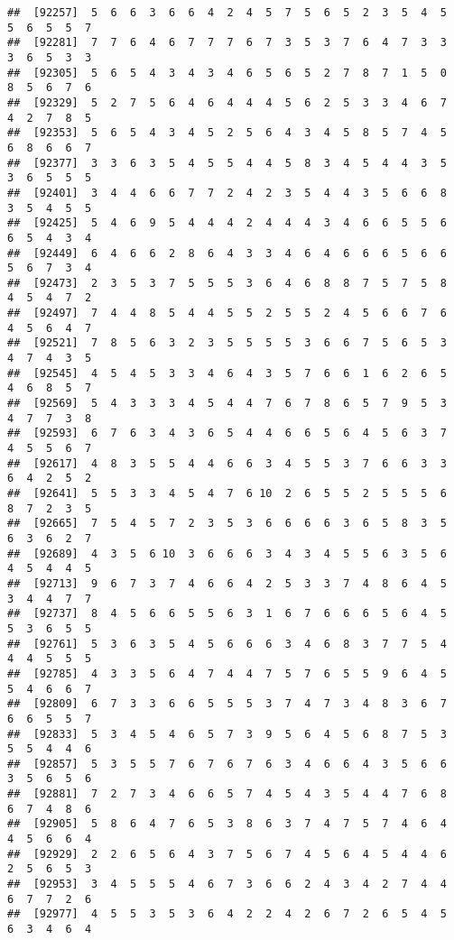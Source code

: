 \documentclass[
]{book}
\begin{document}
\begin{verbatim}
##  [92257]  5  6  6  3  6  6  4  2  4  5  7  5  6  5  2  3  5  4  5  5  6  5  5  7
##  [92281]  7  7  6  4  6  7  7  7  6  7  3  5  3  7  6  4  7  3  3  3  6  5  3  3
##  [92305]  5  6  5  4  3  4  3  4  6  5  6  5  2  7  8  7  1  5  0  8  5  6  7  6
##  [92329]  5  2  7  5  6  4  6  4  4  4  5  6  2  5  3  3  4  6  7  4  2  7  8  5
##  [92353]  5  6  5  4  3  4  5  2  5  6  4  3  4  5  8  5  7  4  5  6  8  6  6  7
##  [92377]  3  3  6  3  5  4  5  5  4  4  5  8  3  4  5  4  4  3  5  3  6  5  5  5
##  [92401]  3  4  4  6  6  7  7  2  4  2  3  5  4  4  3  5  6  6  8  3  5  4  5  5
##  [92425]  5  4  6  9  5  4  4  4  2  4  4  4  3  4  6  6  5  5  6  6  5  4  3  4
##  [92449]  6  4  6  6  2  8  6  4  3  3  4  6  4  6  6  6  5  6  6  5  6  7  3  4
##  [92473]  2  3  5  3  7  5  5  5  3  6  4  6  8  8  7  5  7  5  8  4  5  4  7  2
##  [92497]  7  4  4  8  5  4  4  5  5  2  5  5  2  4  5  6  6  7  6  4  5  6  4  7
##  [92521]  7  8  5  6  3  2  3  5  5  5  5  3  6  6  7  5  6  5  3  4  7  4  3  5
##  [92545]  4  5  4  5  3  3  4  6  4  3  5  7  6  6  1  6  2  6  5  4  6  8  5  7
##  [92569]  5  4  3  3  3  4  5  4  4  7  6  7  8  6  5  7  9  5  3  4  7  7  3  8
##  [92593]  6  7  6  3  4  3  6  5  4  4  6  6  5  6  4  5  6  3  7  4  5  5  6  7
##  [92617]  4  8  3  5  5  4  4  6  6  3  4  5  5  3  7  6  6  3  3  6  4  2  5  2
##  [92641]  5  5  3  3  4  5  4  7  6 10  2  6  5  5  2  5  5  5  6  8  7  2  3  5
##  [92665]  7  5  4  5  7  2  3  5  3  6  6  6  6  3  6  5  8  3  5  6  3  6  2  7
##  [92689]  4  3  5  6 10  3  6  6  6  3  4  3  4  5  5  6  3  5  6  4  5  4  4  5
##  [92713]  9  6  7  3  7  4  6  6  4  2  5  3  3  7  4  8  6  4  5  3  4  4  7  7
##  [92737]  8  4  5  6  6  5  5  6  3  1  6  7  6  6  6  5  6  4  5  5  3  6  5  5
##  [92761]  5  3  6  3  5  4  5  6  6  6  3  4  6  8  3  7  7  5  4  4  4  5  5  5
##  [92785]  4  3  3  5  6  4  7  4  4  7  5  7  6  5  5  9  6  4  5  5  4  6  6  7
##  [92809]  6  7  3  3  6  6  5  5  5  3  7  4  7  3  4  8  3  6  7  6  6  5  5  7
##  [92833]  5  3  4  5  4  6  5  7  3  9  5  6  4  5  6  8  7  5  3  5  5  4  4  6
##  [92857]  5  3  5  5  7  6  7  6  7  6  3  4  6  6  4  3  5  6  6  3  5  6  5  6
##  [92881]  7  2  7  3  4  6  6  5  7  4  5  4  3  5  4  4  7  6  8  6  7  4  8  6
##  [92905]  5  8  6  4  7  6  5  3  8  6  3  7  4  7  5  7  4  6  4  4  5  6  6  4
##  [92929]  2  2  6  5  6  4  3  7  5  6  7  4  5  6  4  5  4  4  6  2  5  6  5  3
##  [92953]  3  4  5  5  5  4  6  7  3  6  6  2  4  3  4  2  7  4  4  6  7  7  2  6
##  [92977]  4  5  5  3  5  3  6  4  2  2  4  2  6  7  2  6  5  4  5  6  3  4  6  4

\end{verbatim}
\end{document}
